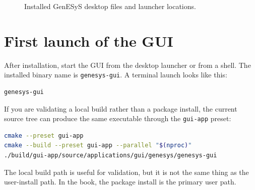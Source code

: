 \begin{figure}[htbp]
    \centering



    \caption{Installed GenESyS desktop files and launcher locations.}
    \label{fig:user-installed-structure}
\end{figure}

\section{First launch of the GUI}
\label{sec:user-installation-first-launch}

After installation, start the GUI from the desktop launcher or from a shell.
The installed binary name is \texttt{genesys-gui}. A terminal launch looks like
this:

\begin{lstlisting}[language=bash,caption={Starting the installed GenESyS GUI},label={lst:user-installation-start-gui}]
genesys-gui
\end{lstlisting}

If you are validating a local build rather than a package install, the current
source tree can produce the same executable through the \texttt{gui-app}
preset:

\begin{lstlisting}[language=bash,caption={Local build-and-run validation path},label={lst:user-installation-build-path}]
cmake --preset gui-app
cmake --build --preset gui-app --parallel "$(nproc)"
./build/gui-app/source/applications/gui/genesys/genesys-gui
\end{lstlisting}

The local build path is useful for validation, but it is not the same thing as
the user-install path. In the book, the package install is the primary user
path.

